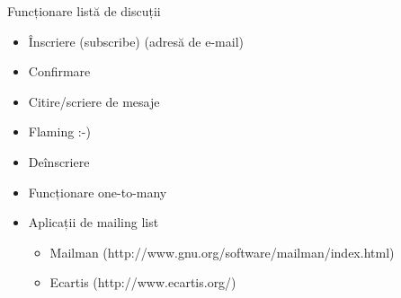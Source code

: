 \documentclass{beamer}
\begin{document}
    \begin{frame}{Funcționare listă de discuții}
    \begin{itemize}
    \setlength{\itemsep}{0.5cm}
    \item Înscriere (subscribe) (adresă de e-mail)
    \item Confirmare
    \item Citire/scriere de mesaje
    \item Flaming :-)
    \item Deînscriere
    \item Funcționare one-to-many
    \item Aplicații de mailing list
        \begin{itemize}
            \item Mailman (http://www.gnu.org/software/mailman/index.html)
            \item Ecartis (http://www.ecartis.org/)
        \end{itemize}
    \end{itemize}
    \end{frame}
\end{document}
